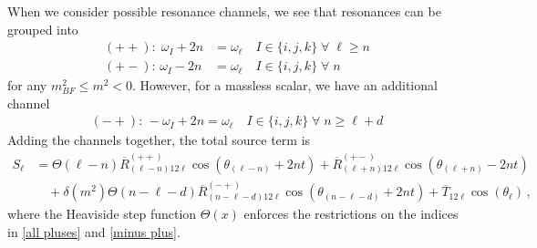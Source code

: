 \documentclass[letterpaper,11pt]{article}
\begin{document}
When we consider possible resonance channels, we see that resonances can be grouped into
\begin{align}
\label{all pluses}
(++): \; \omega_I + 2n &= \omega_\ell \quad I \in \{i,j,k\} \; \forall \; \ell \geq n \\
(+-): \, \omega_I - 2n &=\omega_\ell \quad I \in \{i,j,k\} \; \forall \; n
\end{align}
for any $m^2_{BF} \leq m^2 < 0$. However, for a massless scalar, we have an additional channel
\begin{align}
\label{minus plus}
(-+): \, -\omega_I + 2n = \omega_\ell \quad I \in \{i,j,k\} \; \forall \; n \geq \ell + d
\end{align}
Adding the channels together, the total source term is
\begin{align}
\label{add to integer}
S_\ell &=\Theta \left( \ell - n \right)  \overline{R}^{(++)}_{(\ell - n) 1 2 \ell} \cos \left( \theta_{(\ell - n)} + 2nt \right) + \overline{R}^{(+-)}_{(\ell + n) 1 2 \ell } \cos\left( \theta_{(\ell + n)} - 2nt \right) \nonumber \\
%
& \quad + \delta(m^2) \Theta\left( n - \ell - d \right) \overline{R}^{(-+)}_{(n - \ell - d) 1 2 \ell} \cos \left( \theta_{(n - \ell - d)} + 2nt \right) + \overline{T}_{12\ell} \cos \left( \theta_\ell \right) \, ,
\end{align}
where the Heaviside step function $\Theta(x)$ enforces the restrictions on the indices in \eqref{all pluses} and \eqref{minus plus}.
\end{document}
